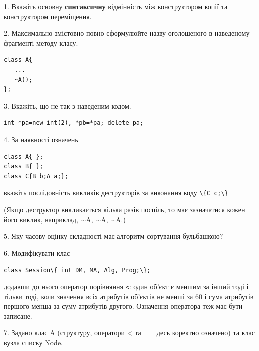 \documentclass[12pt, ukrainian]{article}
\def\code#1{\Verb!#1!}
\begin{document}
{%
1. Вкажіть основну \textbf{синтаксичну} відмінність між конструктором копії та конструктором переміщення.%
\par
\vspace{2mm}
2. Максимально змістовно повно сформулюйте назву оголошеного в наведеному фрагменті методу класу.
\vspace{-3mm}
\begin{verbatim}class A{
   ...
   ~A();
};\end{verbatim}
\vspace{-3mm}
\par
\vspace{2mm}
3. Вкажіть, що не так з наведеним кодом.
\vspace{-3mm}
\begin{verbatim}int *pa=new int(2), *pb=*pa; delete pa;\end{verbatim}
\vspace{-3mm}
\par
\vspace{2mm}
4. За наявності означень
\vspace{-3mm}
\begin{verbatim}
class A{ };
class B{ };
class C{B b;A a;};\end{verbatim}
\vspace{-3mm}
вкажіть послідовність викликів деструкторів за виконання коду \code{\{C c;\}} 

(Якщо деструктор викликається кілька разів поспіль, то має зазначатися кожен його виклик, наприклад, $\sim$A, $\sim$A, $\sim$A.)

\vspace{2mm}
5. Яку часову оцінку складності має алгоритм сортування бульбашкою?
\par
\vspace{2mm}
6. Модифікувати клас 

\qquad\code{class Session\{ int DM, MA, Alg, Prog;\};} 


додавши до нього оператор порівняння \code{<}: один об'єкт є меншим за інший тоді і тільки тоді, коли значення всіх атрибутів об'єктів не менші за 60 і сума атрибутів першого менша за суму атрибутів другого. Означення оператора теж має бути записане.%
\par
\vspace{2mm}
7. 
Задано клас A (структуру, оператори < та == десь коректно означено) та клас вузла списку Node.

}
\end{document}
